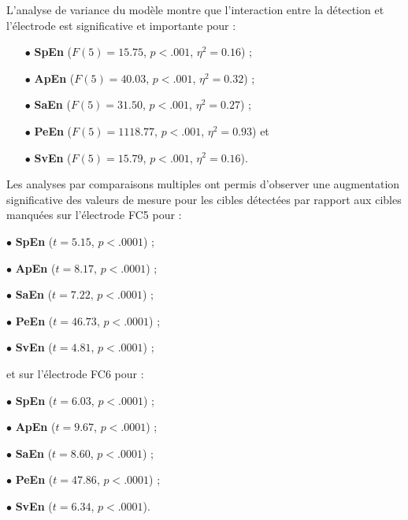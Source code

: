 L'analyse de variance du modèle montre que l'interaction entre la détection et l'électrode est significative et importante pour : 
\begin{itemize}
\item[$\bullet$] \textbf{SpEn} ($F(5)=15.75$, $p<.001$, $\eta^2=0.16$) ; 
\item[$\bullet$] \textbf{ApEn} ($F(5)=40.03$, $p<.001$, $\eta^2=0.32$) ; 
\item[$\bullet$] \textbf{SaEn} ($F(5)=31.50$, $p<.001$, $\eta^2=0.27$) ; 
\item[$\bullet$] \textbf{PeEn} ($F(5)=1118.77$, $p<.001$, $\eta^2=0.93$) et 
\item[$\bullet$] \textbf{SvEn} ($F(5)=15.79$, $p<.001$, $\eta^2=0.16$). \\
\end{itemize}

Les analyses par comparaisons multiples ont permis d'observer une augmentation significative des valeurs de mesure pour les cibles détectées par rapport aux cibles manquées sur l'électrode FC5 pour :
\begin{itemize}
\begin{multicols}{2}
\item[$\bullet$] \textbf{SpEn} ($t=5.15$, $p<.0001$) ; 
\item[$\bullet$] \textbf{ApEn} ($t=8.17$, $p<.0001$) ;
\item[$\bullet$] \textbf{SaEn} ($t=7.22$, $p<.0001$) ;
\item[$\bullet$] \textbf{PeEn} ($t=46.73$, $p<.0001$) ;
\item[$\bullet$] \textbf{SvEn} ($t=4.81$, $p<.0001$) ;
\end{multicols}
\end{itemize}
et sur l'électrode FC6 pour : 
\begin{itemize}
\begin{multicols}{2}
\item[$\bullet$] \textbf{SpEn} ($t=6.03$, $p<.0001$) ;
\item[$\bullet$] \textbf{ApEn} ($t=9.67$, $p<.0001$) ;
\item[$\bullet$] \textbf{SaEn} ($t=8.60$, $p<.0001$) ;
\item[$\bullet$] \textbf{PeEn} ($t=47.86$, $p<.0001$) ;
\item[$\bullet$] \textbf{SvEn} ($t=6.34$, $p<.0001$). \\
\end{multicols}
\end{itemize}

